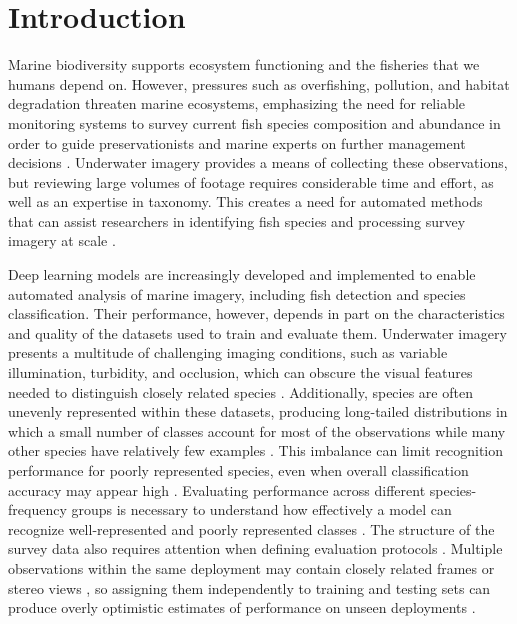 \documentclass[preprint,12pt]{elsarticle}
\begin{document}
\section{Introduction}\label{introduction}

Marine biodiversity supports ecosystem functioning and the fisheries
that we humans depend on. However, pressures such as overfishing,
pollution, and habitat degradation threaten marine ecosystems,
emphasizing the need for reliable monitoring systems to survey current
fish species composition and abundance in order to guide
preservationists and marine experts on further management decisions
\citep{ref1,ref2}.
Underwater imagery provides a means of collecting these observations,
but reviewing large volumes of footage requires considerable time and
effort, as well as an expertise in
taxonomy\citep{ref3,ref4}.
This creates a need for automated methods that can assist researchers in
identifying fish species and processing survey imagery at scale
\citep{ref1,ref5}.

Deep learning models are increasingly developed and implemented to
enable automated analysis of marine imagery, including fish detection
and species
classification\citep{ref6,ref7,ref8}.
Their performance, however, depends in part on the characteristics and
quality of the datasets used to train and evaluate
them\citep{ref9,ref10}. Underwater imagery presents a
multitude of challenging imaging conditions, such as variable
illumination, turbidity, and occlusion, which can obscure the visual
features needed to distinguish closely related species
\citep{ref8,ref9,ref11}. Additionally, species are often
unevenly represented within these datasets, producing long-tailed
distributions in which a small number of classes account for most of the
observations while many other species have relatively few examples
\citep{ref10,ref12,ref13}. This imbalance can limit
recognition performance for poorly represented species, even when
overall classification accuracy may appear high
\citep{ref14,ref15}. Evaluating performance across
different species-frequency groups is necessary to understand how
effectively a model can recognize well-represented and poorly
represented classes \citep{ref13,ref16}. The structure of the survey data
also requires attention when defining evaluation protocols
\citep{ref17,ref18}. Multiple observations within the
same deployment may contain closely related frames or stereo views
\citep{ref4,ref19}, so assigning them independently to
training and testing sets can produce overly optimistic estimates of
performance on unseen deployments \citep{ref17,ref18,ref20}.
\end{document}
